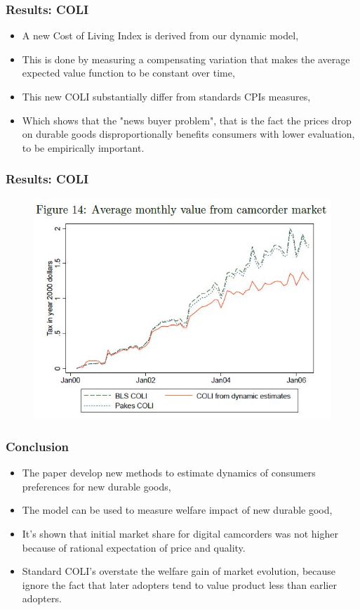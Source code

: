 \documentclass{beamer}
\theoremstyle{definition}
\begin{document}
\begin{frame}
  \frametitle{Results: COLI}

  \begin{itemize}
    \item A new Cost of Living Index is derived from our dynamic model,
    \item This is done by measuring a compensating variation that makes the
      average expected value function to be constant over time,
    \item This new COLI substantially differ from standards CPIs measures,
    \item Which shows that the "news buyer problem", that is the fact the prices
      drop on durable goods disproportionally benefits consumers with lower
      evaluation, to be empirically important.
  \end{itemize}
  
\end{frame}

\begin{frame}
  \frametitle{Results: COLI}

  \begin{figure}
    \includegraphics[width=\linewidth]{14.JPG}
  \end{figure}
\end{frame}

\begin{frame}
  \frametitle{Conclusion}
  
  \begin{itemize}
    \item The paper develop new methods to estimate dynamics of consumers preferences
      for new durable goods,
    \item The model can be used to measure welfare impact of new durable good,
    \item It's shown that initial market share for digital camcorders was not higher
      because of rational expectation of price and quality.
    \item Standard COLI's overstate the welfare gain of market evolution, because 
      ignore the fact that later adopters tend to value product less than earlier adopters.
  \end{itemize}

\end{frame}
\end{document}
